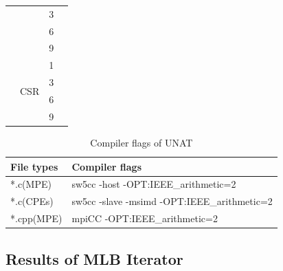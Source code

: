 \documentclass[conference]{IEEEtran}
\begin{document}
\begin{table}[]
\begin{tabular}{|c|c|c|c|}
                     &                      & 3                       &                                      \\ \cline{3-3}
                     &                      & 6                       &                                      \\ \cline{3-3}
                     &                      & 9                       &                                      \\ \cline{2-3}
                     & \multirow{4}{*}{CSR} & 1                       &                                      \\ \cline{3-3}
                     &                      & 3                       &                                      \\ \cline{3-3}
                     &                      & 6                       &                                      \\ \cline{3-3}
                     &                      & 9                       &                                      \\ \hline
\end{tabular}
\label{expDetail}
\end{table}

\begin{table}[]
\caption{Compiler flags of UNAT}
\begin{tabular}{|l|l|}
\hline
\textbf{File types} & \textbf{Compiler flags}                              \\ \hline
*.c(MPE)   & sw5cc -host -OPT:IEEE\_arithmetic=2         \\ \hline
*.c(CPEs)  & sw5cc -slave -msimd -OPT:IEEE\_arithmetic=2 \\ \hline
*.cpp(MPE) & mpiCC -OPT:IEEE\_arithmetic=2               \\ \hline
\end{tabular}
\label{flags}
\end{table}

\subsection{Results of MLB Iterator}
\end{document}
